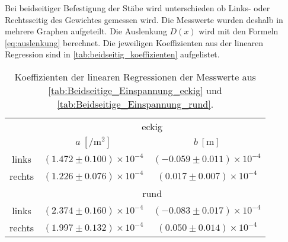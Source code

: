 Bei beidseitiger Befestigung der Stäbe wird unterschieden ob Links- oder Rechtsseitig des Gewichtes gemessen wird.
Die Messwerte wurden deshalb in mehrere Graphen aufgeteilt. %
Die Auslenkung $D(x)$ wird mit den Formeln \eqref{eq:auslenkung} berechnet.
Die jeweiligen Koeffizienten aus der linearen Regression sind in \autoref{tab:beidseitig_koeffizienten} aufgelistet.
\newpage
\begin{table}[h!]
    \centering
    \caption{Koeffizienten der linearen Regressionen der Messwerte aus \autoref{tab:Beidseitige_Einspannung_eckig} und \autoref{tab:Beidseitige_Einspannung_rund}.}
    \label{tab:beidseitig_koeffizienten}
    \begin{tabular}{|c|c c|}
        \toprule
        & \multicolumn{2}{c}{eckig}\\
        \cmidrule(lr){2-3}
        & $a \:[\unit{\per\meter\squared}]$ & $b \:[\unit{\meter}]$\\%
        \midrule
        links &  $(1.472 \pm 0.100)\times 10^{-4}$ & $(-0.059 \pm 0.011)\times 10^{-4}$\\%
        rechts & $(1.226 \pm 0.076)\times 10^{-4}$ & $(0.017 \pm 0.007)\times 10^{-4}$\\%
        \midrule
        &\multicolumn{2}{c}{rund}\\ 
        \midrule
        links &  $(2.374 \pm 0.160)\times 10^{-4}$ & $(-0.083 \pm 0.017)\times 10^{-4}$ \\
        rechts & $(1.997 \pm 0.132)\times 10^{-4}$ & $(0.050 \pm 0.014)\times 10^{-4}$ \\
        \bottomrule
    \end{tabular}
\end{table}

